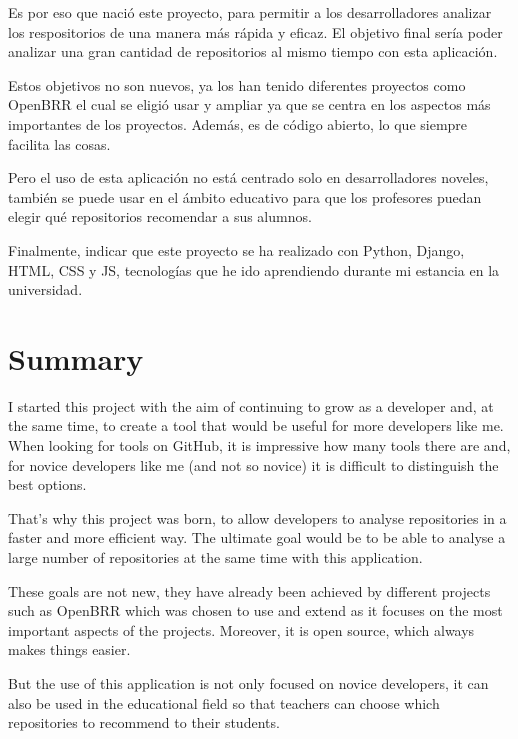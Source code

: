 \documentclass[a4paper, 12pt]{book}
\begin{document}
Es por eso que nació este proyecto, para permitir a los desarrolladores analizar los respositorios de una manera más rápida y eficaz. El objetivo final sería poder analizar una gran cantidad de repositorios al mismo tiempo con esta aplicación.

Estos objetivos no son nuevos, ya los han tenido diferentes proyectos como OpenBRR el cual se eligió usar y ampliar ya que se centra en los aspectos más importantes de los proyectos. Además, es de código abierto, lo que siempre facilita las cosas.

Pero el uso de esta aplicación no está centrado solo en desarrolladores noveles, también se puede usar en el ámbito educativo para que los profesores puedan elegir qué repositorios recomendar a sus alumnos. 

Finalmente, indicar que este proyecto se ha realizado con Python, Django, HTML, CSS  y JS, tecnologías que he ido aprendiendo durante mi estancia en la universidad.


\chapter*{Summary}

I started this project with the aim of continuing to grow as a developer and, at the same time, to create a tool that would be useful for more developers like me. When looking for tools on GitHub, it is impressive how many tools there are and, for novice developers like me (and not so novice) it is difficult to distinguish the best options.

That's why this project was born, to allow developers to analyse repositories in a faster and more efficient way. The ultimate goal would be to be able to analyse a large number of repositories at the same time with this application.

These goals are not new, they have already been achieved by different projects such as OpenBRR which was chosen to use and extend as it focuses on the most important aspects of the projects. Moreover, it is open source, which always makes things easier.

But the use of this application is not only focused on novice developers, it can also be used in the educational field so that teachers can choose which repositories to recommend to their students. 
\end{document}
